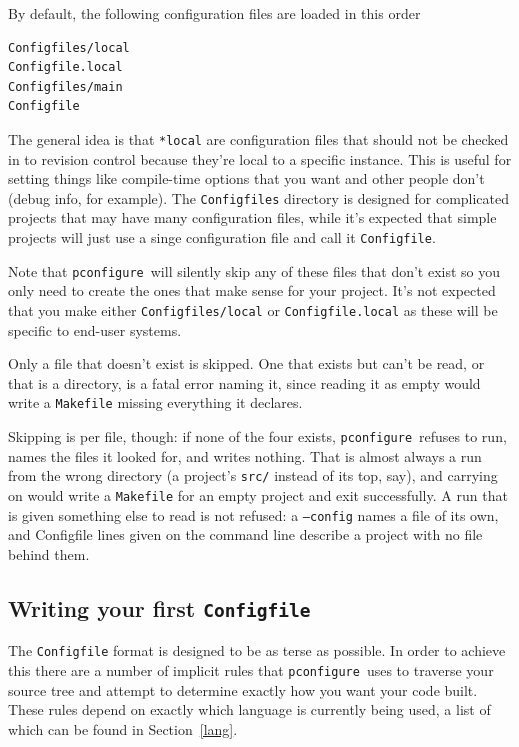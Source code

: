 \documentclass{article}
\newcommand{\pconfigure}{\texttt{pconfigure}}
\begin{document}
By default, the following configuration files are loaded in this order
\begin{verbatim}
Configfiles/local
Configfile.local
Configfiles/main
Configfile
\end{verbatim}
The general idea is that \texttt{*local} are configuration files that
should not be checked in to revision control because they're local to
a specific instance.  This is useful for setting things like
compile-time options that you want and other people don't (debug info,
for example).  The \texttt{Configfiles} directory is designed for
complicated projects that may have many configuration files, while
it's expected that simple projects will just use a singe configuration
file and call it \texttt{Configfile}.

Note that \pconfigure\ will silently skip any of these files that
don't exist so you only need to create the ones that make sense for
your project.  It's not expected that you make either
\texttt{Configfiles/local} or \texttt{Configfile.local} as these will
be specific to end-user systems.

Only a file that doesn't exist is skipped.  One that exists but can't
be read, or that is a directory, is a fatal error naming it, since
reading it as empty would write a \texttt{Makefile} missing everything
it declares.

Skipping is per file, though: if none of the four exists, \pconfigure\
refuses to run, names the files it looked for, and writes nothing.
That is almost always a run from the wrong directory (a project's
\texttt{src/} instead of its top, say), and carrying on would write a
\texttt{Makefile} for an empty project and exit successfully.  A run
that is given something else to read is not refused: a
\texttt{--config} names a file of its own, and Configfile lines given
on the command line describe a project with no file behind them.

\subsection{Writing your first \texttt{Configfile}}

The \texttt{Configfile} format is designed to be as terse as possible.
In order to achieve this there are a number of implicit rules that
\pconfigure\ uses to traverse your source tree and attempt to
determine exactly how you want your code built.  These rules depend on
exactly which language is currently being used, a list of which can be
found in Section~\ref{lang}.
\end{document}
